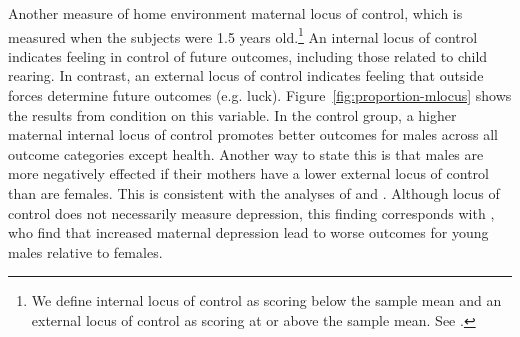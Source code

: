 Another measure of home environment maternal locus of control, which is measured when the subjects were 1.5 years old.\footnote{We define internal locus of control as scoring below the sample mean and an external locus of control as scoring at or above the sample mean. See \citet{Rotter_1966_PMGaA}.} An internal locus of control indicates feeling in control of future outcomes, including those related to child rearing. In contrast, an external locus of control indicates feeling that outside forces determine future outcomes (e.g. luck). Figure~\ref{fig:proportion-mlocus} shows the results from condition on this variable. In the control group, a higher maternal internal locus of control promotes better outcomes for males across all outcome categories except health. Another way to state this is that males are more negatively effected if their mothers have a lower external locus of control than are females. This is consistent with the analyses of \citet{Schore_2017_IMHJ} and \citet{golding2016psychology}. Although locus of control does not necessarily measure depression, this finding corresponds with \citet{Beeghly-etal_2017_IMHJ}, who find that increased maternal depression lead to worse outcomes for young males relative to females.

